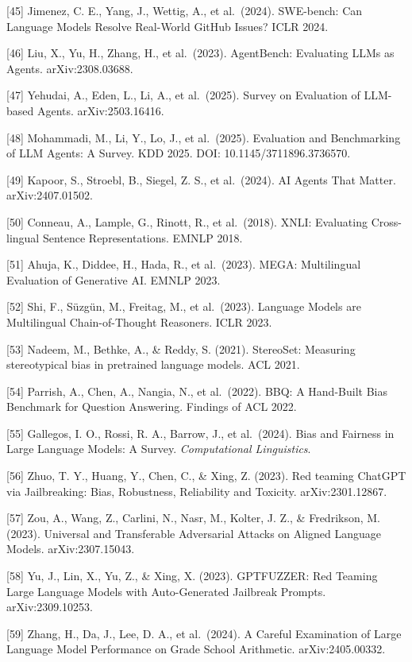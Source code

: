 {[}45{]} Jimenez, C. E., Yang, J., Wettig, A., et al.~(2024). SWE-bench: Can Language Models Resolve Real-World GitHub Issues? ICLR 2024.

{[}46{]} Liu, X., Yu, H., Zhang, H., et al.~(2023). AgentBench: Evaluating LLMs as Agents. arXiv:2308.03688.

{[}47{]} Yehudai, A., Eden, L., Li, A., et al.~(2025). Survey on Evaluation of LLM-based Agents. arXiv:2503.16416.

{[}48{]} Mohammadi, M., Li, Y., Lo, J., et al.~(2025). Evaluation and Benchmarking of LLM Agents: A Survey. KDD 2025. DOI: 10.1145/3711896.3736570.

{[}49{]} Kapoor, S., Stroebl, B., Siegel, Z. S., et al.~(2024). AI Agents That Matter. arXiv:2407.01502.

{[}50{]} Conneau, A., Lample, G., Rinott, R., et al.~(2018). XNLI: Evaluating Cross-lingual Sentence Representations. EMNLP 2018.

{[}51{]} Ahuja, K., Diddee, H., Hada, R., et al.~(2023). MEGA: Multilingual Evaluation of Generative AI. EMNLP 2023.

{[}52{]} Shi, F., Süzgün, M., Freitag, M., et al.~(2023). Language Models are Multilingual Chain-of-Thought Reasoners. ICLR 2023.

{[}53{]} Nadeem, M., Bethke, A., \& Reddy, S. (2021). StereoSet: Measuring stereotypical bias in pretrained language models. ACL 2021.

{[}54{]} Parrish, A., Chen, A., Nangia, N., et al.~(2022). BBQ: A Hand-Built Bias Benchmark for Question Answering. Findings of ACL 2022.

{[}55{]} Gallegos, I. O., Rossi, R. A., Barrow, J., et al.~(2024). Bias and Fairness in Large Language Models: A Survey. \emph{Computational Linguistics}.

{[}56{]} Zhuo, T. Y., Huang, Y., Chen, C., \& Xing, Z. (2023). Red teaming ChatGPT via Jailbreaking: Bias, Robustness, Reliability and Toxicity. arXiv:2301.12867.

{[}57{]} Zou, A., Wang, Z., Carlini, N., Nasr, M., Kolter, J. Z., \& Fredrikson, M. (2023). Universal and Transferable Adversarial Attacks on Aligned Language Models. arXiv:2307.15043.

{[}58{]} Yu, J., Lin, X., Yu, Z., \& Xing, X. (2023). GPTFUZZER: Red Teaming Large Language Models with Auto-Generated Jailbreak Prompts. arXiv:2309.10253.

{[}59{]} Zhang, H., Da, J., Lee, D. A., et al.~(2024). A Careful Examination of Large Language Model Performance on Grade School Arithmetic. arXiv:2405.00332.

